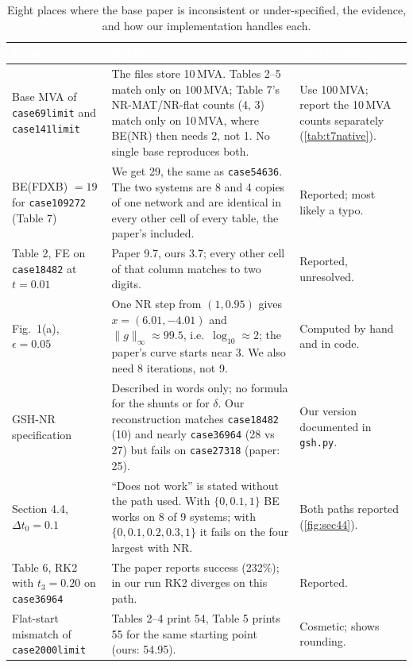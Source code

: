 \documentclass[11pt,a4paper]{article}
\newcommand{\thead}[1]{\textcolor{white}{\sffamily\bfseries\small #1}}
\newcommand{\headrow}{\rowcolor{navy}}
\newcommand{\ninf}[1]{\lVert #1\rVert_\infty}
\newcommand{\code}[1]{\texttt{#1}}
\begin{document}
\begin{table}[!htbp]
\centering
\caption[Eight places where the paper is inconsistent or under-specified]{Eight places where the base paper
is inconsistent or under-specified, the evidence, and how our implementation handles each.}
\label{tab:audit}
\footnotesize
\begin{tabularx}{\textwidth}{@{}>{\raggedright\arraybackslash}p{3.2cm} L >{\raggedright\arraybackslash}p{3.1cm}@{}}
\toprule
\headrow \thead{Issue} & \thead{Evidence} & \thead{Our handling} \\
\midrule
Base MVA of \code{case69limit} and \code{case141limit} &
The files store 10\,MVA. Tables 2--5 match only on 100\,MVA; Table 7's NR-MAT/NR-flat counts (4, 3) match only on 10\,MVA, where BE(NR) then needs 2, not 1. No single base reproduces both. &
Use 100\,MVA; report the 10\,MVA counts separately (\cref{tab:t7native}). \\
BE(FDXB) $=19$ for \code{case109272} (Table 7) &
We get 29, the same as \code{case54636}. The two systems are 8 and 4 copies of one network and are identical in every other cell of every table, the paper's included. &
Reported; most likely a typo. \\
Table 2, FE on \code{case18482} at $t=0.01$ &
Paper 9.7, ours 3.7; every other cell of that column matches to two digits. &
Reported, unresolved. \\
Fig.~1(a), $\epsilon=0.05$ &
One NR step from $(1,0.95)$ gives $x=(6.01,-4.01)$ and $\ninf{g}\approx 99.5$, i.e.\ $\log_{10}\approx2$; the paper's curve starts near 3. We also need 8 iterations, not 9. &
Computed by hand and in code. \\
GSH-NR specification &
Described in words only; no formula for the shunts or for $\delta$. Our reconstruction matches \code{case18482} (10) and nearly \code{case36964} (28 vs 27) but fails on \code{case27318} (paper: 25). &
Our version documented in \code{gsh.py}. \\
Section 4.4, $\Delta t_0=0.1$ &
``Does not work'' is stated without the path used. With $\{0,0.1,1\}$ BE works on 8 of 9 systems; with $\{0,0.1,0.2,0.3,1\}$ it fails on the four largest with NR. &
Both paths reported (\cref{fig:sec44}). \\
Table 6, RK2 with $t_3=0.20$ on \code{case36964} &
The paper reports success (232\%); in our run RK2 diverges on this path. &
Reported. \\
Flat-start mismatch of \code{case2000limit} &
Tables 2--4 print 54, Table 5 prints 55 for the same starting point (ours: 54.95). &
Cosmetic; shows rounding. \\
\bottomrule
\end{tabularx}
\end{table}
\end{document}
